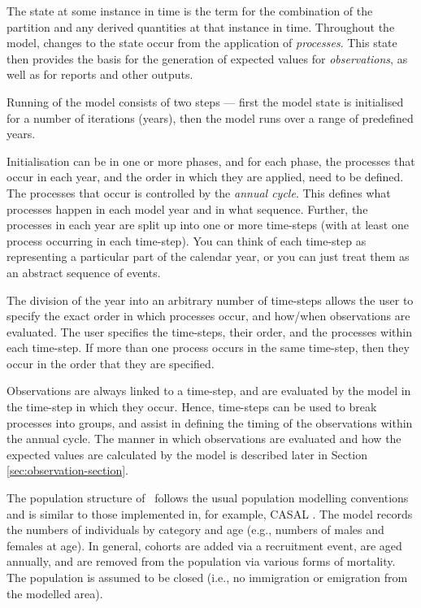 The state at some instance in time is the term for the combination of the partition and any derived quantities at that instance in time. Throughout the model, changes to the state occur from the application of \emph{processes}. This state then provides the basis for the generation of expected values for \emph{observations}, as well as for reports and other outputs.

Running of the model consists of two steps --- first the model state is initialised for a number of iterations (years), then the model runs over a range of predefined years.

Initialisation can be in one or more phases, and for each phase, the processes that occur in each year, and the order in which they are applied, need to be defined. The processes that occur is controlled by the \emph{annual cycle}. This defines what processes happen in each model year and in what sequence. Further, the processes in each year are split up into one or more time-steps (with at least one process occurring in each time-step). You can think of each time-step as representing a particular part of the calendar year, or you can just treat them as an abstract sequence of events.

The division of the year into an arbitrary number of time-steps allows the user to specify the exact order in which processes occur, and how/when observations are evaluated. The user specifies the time-steps, their order, and the processes within each time-step. If more than one process occurs in the same time-step, then they occur in the order that they are specified.

Observations are always linked to a time-step, and are evaluated by the model in the time-step in which they occur. Hence, time-steps can be used to break processes into groups, and assist in defining the timing of the observations within the annual cycle. The manner in which observations are evaluated and how the expected values are calculated by the model is described later in Section \ref{sec:observation-section}.

The population structure of \CNAME\ follows the usual population modelling conventions and is similar to those implemented in, for example, CASAL \citep{1388}. The model records the numbers of individuals by category and age (e.g., numbers of males and females at age). In general, cohorts are added via a recruitment event, are aged annually, and are removed from the population via various forms of mortality. The population is assumed to be closed (i.e., no immigration or emigration from the modelled area).

